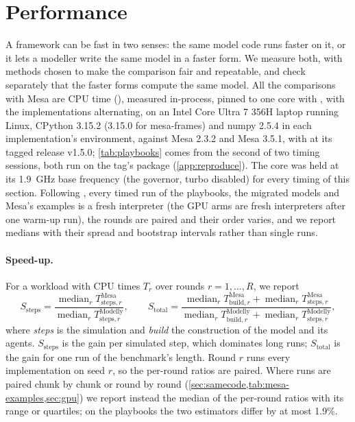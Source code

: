 \section{Performance}
\label{sec:performance}

A framework can be fast in two senses: the same model code runs faster on it, or it lets a
modeller write the same model in a faster form. We measure both, with methods chosen to make
the comparison fair and repeatable, and check separately that the faster forms compute the
same model. All the comparisons with Mesa are CPU time (), measured
in-process, pinned to one core with , with the implementations alternating, on an
Intel Core Ultra 7 356H laptop running Linux, CPython 3.15.2 (3.15.0 for mesa-frames) and
numpy 2.5.4 in each implementation's environment, against Mesa 2.3.2 and Mesa 3.5.1, with
\modelly{} at its tagged release v1.5.0; \cref{tab:playbooks} comes from
the second of two timing sessions, both run on the tag's  package
(\cref{app:reproduce}). The core was held at its 1.9~GHz
base frequency (the  governor, turbo disabled) for every timing of this
section. Following
\citet{kalibera2013rigorous}, every timed run of the playbooks, the migrated models and Mesa's examples is
a fresh interpreter (the GPU arms are fresh interpreters after one warm-up run), the rounds are
paired and their order varies, and we report medians with their spread and bootstrap intervals
rather than single runs.

\paragraph{Speed-up.} For a workload with CPU times $T_{r}$ over rounds $r = 1, \dots, R$, we
report
\begin{equation}
  S_{\mathrm{steps}} = \frac{\operatorname{median}_r T^{\mathrm{Mesa}}_{\mathrm{steps},r}}
  {\operatorname{median}_r T^{\mathrm{Modelly}}_{\mathrm{steps},r}},
  \qquad
  S_{\mathrm{total}} = \frac{\operatorname{median}_r T^{\mathrm{Mesa}}_{\mathrm{build},r}
  + \operatorname{median}_r T^{\mathrm{Mesa}}_{\mathrm{steps},r}}
  {\operatorname{median}_r T^{\mathrm{Modelly}}_{\mathrm{build},r}
  + \operatorname{median}_r T^{\mathrm{Modelly}}_{\mathrm{steps},r}},
  \label{eq:speedup}
\end{equation}
where \emph{steps} is the simulation and \emph{build} the construction of the model and its
agents. $S_{\mathrm{steps}}$ is the gain per simulated step, which dominates long runs;
$S_{\mathrm{total}}$ is the gain for one run of the benchmark's length. Round $r$ runs every
implementation on seed $r$, so the per-round ratios are paired. Where runs are paired chunk by chunk or round by round
(\cref{sec:samecode,tab:mesa-examples,sec:gpu}) we report instead the
median of the per-round ratios with its range or quartiles; on the playbooks the two
estimators differ by at most 1.9\%.

